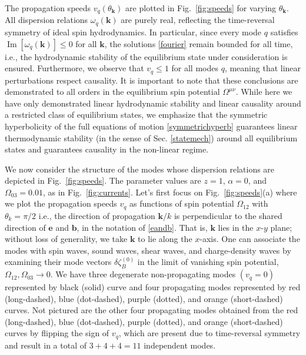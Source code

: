 \documentclass[12pt,aps,prd,nofootinbib,noshowkeys,noshowpacs,longbibliography,
superscriptaddress,tightenlines,floatfix,preprintnumbers]{revtex4-2}
\begin{document}
The propagation speeds $v_q(\theta_{\bm k})$ are plotted in Fig.~\ref{fig:speeds} for varying $\theta_{\bm k}$. All dispersion relations $\omega_q(\bm k)$ are purely real, reflecting the time-reversal symmetry of ideal spin hydrodynamics. In particular, since every mode $q$ satisfies $\operatorname{Im}[\omega_q(\bm k)]\le 0$ for all $\bm k$, the solutions \eqref{fourier} remain bounded for all time, i.e., the hydrodynamic stability of the equilibrium state under consideration is ensured. Furthermore, we observe that $v_q\le 1$ for all modes $q$, meaning that linear perturbations respect causality. It is important to note that these conclusions are demonstrated to all orders in the equilibrium spin potential $\Omega^{\mu\nu}$. While here we have only demonstrated linear hydrodynamic stability and linear causality around a restricted class of equilibrium states, we emphasize that the symmetric hyperbolicity of the full equations of motion \eqref{symmetrichyperb} guarantees linear thermodynamic stability (in the sense of Sec. \ref{statemech}) around all equilibrium states and guarantees causality in the non-linear regime.

We now consider the structure of the modes whose dispersion relations are depicted in Fig.~\ref{fig:speeds}. The parameter values are $z=1$, $\alpha=0$, and $\Omega_{03}=0.01$, as in Fig.~\ref{fig:currents}.
Let's first focus on Fig.~\ref{fig:speeds}(a) where we plot the propagation speeds $v_q$ as functions of spin potential $\Omega_{12}$ with $\theta_k=\pi/2$ i.e., the direction of propagation $\bm k/k$ is perpendicular to the shared direction of $\bm e$ and $\bm b$, in the notation of \eqref{eandb}. That is, $\bm k$ lies in the $x$-$y$ plane; without loss of generality, we take $\bm k$ to lie along the $x$-axis. One can associate the modes with spin waves, sound waves, shear waves, and charge-density waves by examining their mode vectors $\delta \zeta_{B}^{(0)}$ in the limit of vanishing spin potential, $\Omega_{12}, \Omega_{03}\rightarrow 0$.
We have three degenerate non-propagating modes $(v_q=0)$ represented by black (solid) curve and four propagating modes represented by red (long-dashed), blue (dot-dashed), purple (dotted), and orange (short-dashed) curves.
Not pictured are the other four propagating modes obtained from the red (long-dashed), blue (dot-dashed), purple (dotted), and orange (short-dashed) curves by flipping the sign of $v_q$, which are present due to time-reversal symmetry and result in a total of $3+4+4=11$ independent modes.
\end{document}
